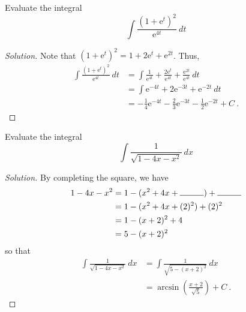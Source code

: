\documentclass[compacto,10pt,comentarios]{aleph-notas}
\begin{document}
\begin{ejer}
    Evaluate the integral
    $$
        \int \frac{\left(1 + \mathrm{e}^{t} \right)^{2}}{\mathrm{e}^{4t}} ~ dt
    $$
\end{ejer}
\begin{proof}[Solution]
    Note that $(1+\mathrm{e}^{t})^2 = 1 + 2\mathrm{e}^{t} + \mathrm{e}^{2t}$. Thus,
    \begin{align*}
        \int \frac{\left(1 + \mathrm{e}^{t} \right)^{2}}{\mathrm{e}^{4t}} ~ dt
        & = \int \frac{1}{\mathrm{e}^{4t}} + \frac{\mathrm{2e}^{t}}{\mathrm{e}^{4t}} + \frac{\mathrm{e}^{2t}}{\mathrm{e}^{4t}} ~ dt \\
        & = \int \mathrm{e}^{-4t} + 2\mathrm{e}^{-3t} + \mathrm{e}^{-2t} ~ dt \\
        & = -\frac{1}{4} \mathrm{e}^{-4t} - \frac{2}{3} \mathrm{e}^{-3t} - \frac{1}{2} \mathrm{e}^{-2t} + C ~ .
    \end{align*}
\end{proof}

\begin{ejer}
    Evaluate the integral
    $$
        \int \frac{1}{\sqrt{1 - 4x - x^{2}}} ~ dx
    $$
\end{ejer}
\begin{proof}[Solution]
    By completing the square, we have
    \begin{align*}
        1 - 4x - x^{2} 
        & = 1 - (x^{2} + 4x + \text{\makebox[1cm]{\hrulefill}}) + \text{\makebox[1cm]{\hrulefill}} \\
        & = 1 - (x^{2} + 4x + (2)^{2}) + (2)^2 \\
        & = 1 - (x + 2)^{2} + 4 \\
        & = 5 - (x + 2)^{2}
    \end{align*}
    so that
    \begin{align*}
        \int \frac{1}{\sqrt{1 - 4x - x^{2}}} ~ dx
        & = \int \frac{1}{\sqrt{5 - (x + 2)^{2}}} ~ dx \\
        & = \arcsin\left( \frac{x + 2}{\sqrt{5}} \right) + C ~ .
    \end{align*}
\end{proof}
\end{document}
